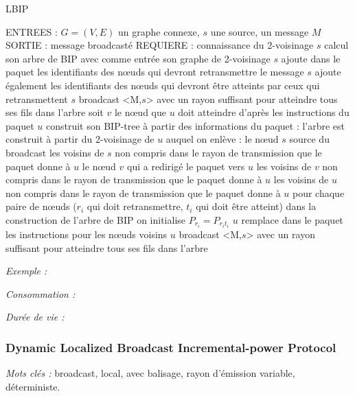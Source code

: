 \begin{algorithm}[H]
\caption{LBIP}
\label{algo_LBIP}
\begin{algorithmic}
\STATE ENTREES : $G=(V,E)$ un graphe connexe, $s$ une source, un message $M$
\STATE SORTIE : message broadcasté
\STATE REQUIERE : connaissance du 2-voisinage
\STATE $s$ calcul son arbre de BIP avec comme entrée son graphe de 2-voisinage
\STATE $s$ ajoute dans le paquet les identifiants des nœuds qui devront retransmettre le message
\STATE $s$ ajoute également les identifiants des nœuds qui devront être atteints par ceux qui retransmettent
\STATE $s$ broadcast <M,$s$> avec un rayon suffisant pour atteindre tous ses fils dans l'arbre
		\STATE soit $v$ le nœud que $u$ doit atteindre d'après les instructions du paquet
		\STATE $u$ construit son BIP-tree à partir des informations du paquet :
			 \INDSTATE l'arbre est construit à partir du 2-voisinage de $u$ auquel on enlève :
			 	 \INDSTATE[2]le nœud $s$ source du broadcast
				 \INDSTATE[2]les voisins de $s$ non compris dans le rayon de transmission que le paquet donne à $u$
				 \INDSTATE[2]le nœud $v$ qui a redirigé le paquet vers $u$
				 \INDSTATE[2]les voisins de $v$ non compris dans le rayon de transmission que le paquet donne à $u$
				\INDSTATE[2]les voisins de $u$ non compris dans le rayon de transmission que le paquet donne à $u$
			\INDSTATE[1] pour chaque paire de nœuds ($r_i$ qui doit retransmettre, $t_i$ qui doit être atteint)
				\INDSTATE[2] dans la construction de l'arbre de BIP on initialise $P_{r_i} = P_{r_i t_i}$
			\INDSTATE[1] $u$ remplace dans le paquet les instructions pour les nœuds voisins
			\INDSTATE[1] $u$ broadcast <M,$s$> avec un rayon suffisant pour atteindre tous ses fils dans l'arbre
	\ENDIF
\ENDIF
\end{algorithmic}
\end{algorithm}


\emph{Exemple :} 

\emph{Consommation :} 

\emph{Durée de vie :} 



\subsubsection{Dynamic Localized Broadcast Incremental-power Protocol \cite{Champ2009DLBIP}}
\emph{Mots clés :} broadcast, local, avec balisage, rayon d'émission variable, déterministe.

